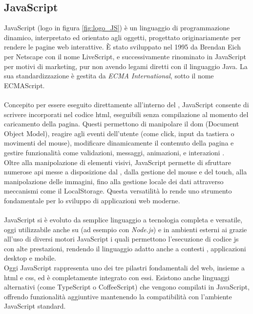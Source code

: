 \subsection{JavaScript}
\label{subsec:js}
\noindent JavaScript (logo in figura \ref{fig:logo_JS}) è un linguaggio di programmazione dinamico, interpretato ed orientato agli oggetti, progettato originariamente per rendere le pagine web interattive.
È stato sviluppato nel 1995 da Brendan Eich per Netscape con il nome LiveScript, e successivamente rinominato in JavaScript per motivi di marketing, pur non avendo legami diretti con il linguaggio Java. La sua standardizzazione è gestita da \textit{ECMA International}, sotto il nome ECMAScript.\\
\\
Concepito per essere eseguito direttamente all’interno del , JavaScript consente di scrivere  incorporati nel codice \acrshort{html}, eseguibili senza compilazione al momento del caricamento della pagina. Questi  permettono di manipolare il \acrshort{dom} (Document Object Model), reagire agli eventi dell’utente (come click, input da tastiera o movimenti del mouse), modificare dinamicamente il contenuto della pagina e gestire funzionalità come validazioni, messaggi, animazioni, e interazioni .\\
Oltre alla manipolazione di elementi visivi, JavaScript permette di sfruttare numerose \acrshort{api} messe a disposizione dal , dalla gestione del mouse e del touch, alla manipolazione delle immagini, fino alla gestione locale dei dati attraverso meccanismi come il LocalStorage. Questa versatilità lo rende uno strumento fondamentale per lo sviluppo di applicazioni web moderne.\\
\\
JavaScript si è evoluto da semplice linguaggio  a tecnologia completa e versatile, oggi utilizzabile anche su  (ad esempio con \textit{Node.js}) e in ambienti esterni ai  grazie all’uso di diversi motori JavaScript i quali permettono l’esecuzione di codice \acrshort{js} con alte prestazioni, rendendo il linguaggio adatto anche a contesti , applicazioni desktop e mobile.\\
Oggi JavaScript rappresenta uno dei tre pilastri fondamentali del web, insieme a \acrshort{html} e \acrshort{css}, ed è completamente integrato con essi. Esistono anche linguaggi alternativi (come TypeScript o CoffeeScript) che vengono compilati in JavaScript, offrendo funzionalità aggiuntive mantenendo la compatibilità con l’ambiente JavaScript standard.
